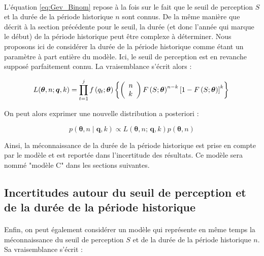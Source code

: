 \documentclass[11pt]{article}
\begin{document}
		\paragraph{}
		L'équation \ref{eq:Gev_Binom} repose à la fois sur le fait que le seuil de perception $S$ et la durée de la période historique $n$ sont connus. De la même manière que décrit à la section précédente pour le seuil, la durée (et donc l'année qui marque le début) de la période historique peut être complexe à déterminer. Nous proposons ici de considérer la durée de la période historique comme étant un paramètre à part entière du modèle. Ici, le seuil de perception est en revanche supposé parfaitement connu. La vraisemblance s'écrit alors : 
		 
				\begin{equation}
				L(\boldsymbol{\theta}, n ; \boldsymbol{q}, k) = \prod_{t=1}^j f\left(q_t;\boldsymbol{\theta}\right) \left\{\left(\begin{array}{l}
				n \\
				k
				\end{array}\right) F\left(S;\boldsymbol{\theta}\right)^{n-k}\left[1-F\left(S;\boldsymbol{\theta}\right)\right]^k\right\} \\
				\label{eq:Gev_Binom_uN}
				\end{equation}
				
		On peut alors exprimer une nouvelle distribution a posteriori :
		
				\begin{equation}
					p(\boldsymbol{\theta}, n \mid \boldsymbol{q},k) \propto L(\boldsymbol{\theta},n;\,\boldsymbol{q},k) p(\boldsymbol{\theta},n)
					\label{eq:Bayes_uN}
				\end{equation}
			
		Ainsi, la méconnaissance de la durée de la période historique est prise en compte par le modèle et est reportée dans l'incertitude des résultats. Ce modèle sera nommé "modèle C" dans les sections suivantes. 
	
	\subsection{Incertitudes autour du seuil de perception et de la durée de la période historique}
	
	\paragraph{}
	Enfin, on peut également considérer un modèle qui représente en même temps la méconnaissance du seuil de perception $S$ et de la durée de la période historique $n$. Sa vraisemblance s'écrit :  
	
\end{document}

